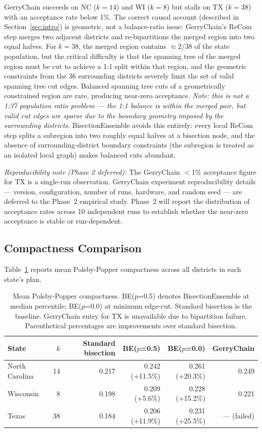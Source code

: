 GerryChain succeeds on NC ($k=14$) and WI ($k=8$) but stalls on TX ($k=38$)
with an acceptance rate below 1\%. The correct causal account (described in
Section~\ref{sec:intro}) is geometric, not a balance-ratio issue: GerryChain's
ReCom step merges two adjacent districts and re-bipartitions the merged region
into two equal halves. For $k=38$, the merged region contains $\approx 2/38$
of the state population, but the critical difficulty is that the spanning tree
of the merged region must be cut to achieve a 1:1 split within that region,
and the geometric constraints from the 36 surrounding districts severely limit
the set of valid spanning tree cut edges. Balanced spanning tree cuts of a
geometrically constrained region are rare, producing near-zero acceptance.
\emph{Note: this is not a 1:37 population ratio problem --- the 1:1 balance is
within the merged pair, but valid cut edges are sparse due to the boundary
geometry imposed by the surrounding districts.}
BisectionEnsemble avoids this entirely: every local ReCom
step splits a subregion into two roughly equal halves at a bisection node,
and the absence of surrounding-district boundary constraints (the subregion is
treated as an isolated local graph) makes balanced cuts abundant.

\emph{Reproducibility note (Phase 2 deferred):} The GerryChain $<$1\%
acceptance figure for TX is a single-run observation. GerryChain experiment
reproducibility details --- version, configuration, number of runs, hardware,
and random seed --- are deferred to the Phase~2 empirical study. Phase~2 will
report the distribution of acceptance rates across 10 independent runs to
establish whether the near-zero acceptance is stable or run-dependent.

\subsection{Compactness Comparison}
\label{sec:results:compactness}

Table~\ref{tab:compactness} reports mean Polsby-Popper compactness across
all districts in each state's plan.

\begin{table}[h]
\centering
\begin{tabular}{lrrrrr}
\toprule
State & $k$ & Standard bisection & BE($p$=0.5) & BE($p$=0.0) & GerryChain \\
\midrule
North Carolina & 14 & 0.217 & 0.242 (+11.5\%) & 0.261 (+20.3\%) & 0.249 \\
Wisconsin      & 8  & 0.198 & 0.209 (+5.6\%)  & 0.228 (+15.2\%) & 0.221 \\
Texas          & 38 & 0.184 & 0.206 (+11.9\%) & 0.231 (+25.5\%) & --- (failed) \\
\bottomrule
\end{tabular}
\caption{Mean Polsby-Popper compactness. BE($p$=0.5) denotes BisectionEnsemble
  at median percentile; BE($p$=0.0) at minimum edge-cut.
  Standard bisection is the baseline. GerryChain entry for TX is unavailable
  due to bipartition failure. Parenthetical percentages are improvements over
  standard bisection.}
\label{tab:compactness}
\end{table}

